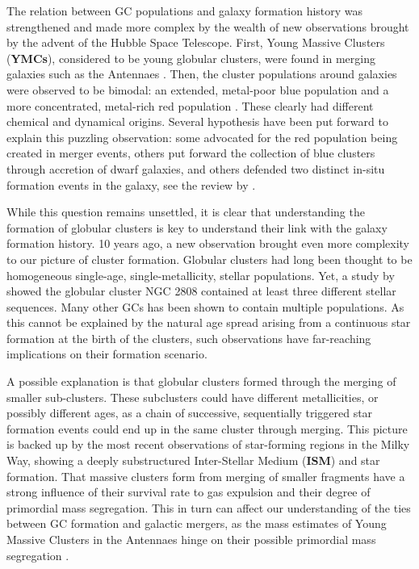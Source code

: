 The relation between GC populations and galaxy formation history was strengthened and made more complex by the wealth of new observations brought by the advent of the Hubble Space Telescope. First, Young Massive Clusters (\textbf{YMCs}), considered to be young globular clusters, were found in merging galaxies such as the Antennaes \citep{Whitmore1995}. Then, the cluster populations around galaxies were observed to be bimodal: an extended, metal-poor blue population and a more concentrated, metal-rich red population \citep{Zepf1993,Geisler1996}. These clearly had different chemical and dynamical origins. Several hypothesis have been put forward to explain this puzzling observation: some advocated for the red population being created in merger events, others put forward the collection of blue clusters through accretion of dwarf galaxies, and others defended two distinct in-situ formation events in the galaxy, see the review by \cite{Brodie2006}.


While this question remains unsettled, it is clear that understanding the formation of globular clusters is key to understand their link with the galaxy formation history. 10 years ago, a new observation brought even more complexity to our picture of cluster formation. Globular clusters had long been thought to be homogeneous single-age, single-metallicity, stellar populations. Yet, a study by \cite{Piotto2007} showed the globular cluster NGC 2808 contained at least three different stellar sequences. Many other GCs has been shown to contain multiple populations. As this cannot be explained by the natural age spread arising from a continuous star formation at the birth of the clusters, such observations have far-reaching implications on their formation scenario.

A possible explanation is that globular clusters formed through the merging of smaller sub-clusters. These subclusters could have different metallicities, or possibly different ages, as a chain of successive, sequentially triggered star formation events could end up in the same cluster through merging. This picture is backed up by the most recent observations of star-forming regions in the Milky Way, showing a deeply substructured Inter-Stellar Medium (\textbf{ISM}) and star formation. That massive clusters form from merging of smaller fragments have a strong influence of their survival rate to gas expulsion and their degree of primordial mass segregation. This in turn can affect our understanding of the ties between GC formation and galactic mergers, as the mass estimates of Young Massive Clusters in the Antennaes hinge on their possible primordial mass segregation \citep{McCrady2005}.

